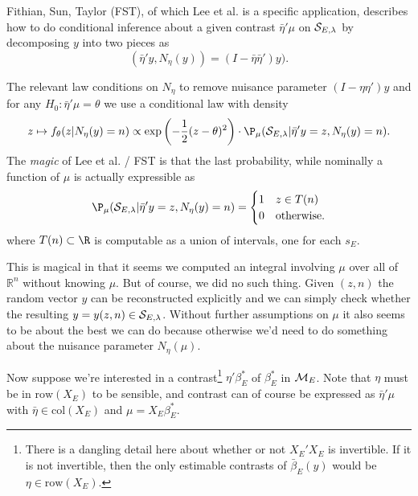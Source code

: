 \documentclass{article}
\newcommand{\OLS}{\bar{\beta}}
\begin{document}
        Fithian, Sun, Taylor (FST), of which Lee et al. is a specific
        application, describes how to do conditional inference about a
        given contrast $\bar{\eta}'\mu$ on ${\cal S}_{E,\lambda}$ by decomposing
        $y$ into two pieces as
        $$ (\bar{\eta}'y, N_{\eta}(y))=(I - \bar{\eta}\bar{\eta}')y).
        $$

        The relevant law conditions on $N_{\eta}$ to remove nuisance
        parameter $(I-\eta\eta')y$ and for any
        $H_0:\bar{\eta}'\mu=\theta$ we use a conditional law with
        density
        \begin{equation}
          \label{eq:selective:density}
        z \mapsto f_{\theta}(z | N_{\eta}(y)=n) \propto \exp
        \left(-\frac{1}{2}(z-\theta)^2 \right) \cdot \P_{\mu}({\cal
          S}_{E,\lambda} | \bar{\eta}'y=z, N_{\eta}(y)=n).
        \end{equation}
        The {\em magic} of Lee et al. / FST is that the last
        probability, while nominally a function of $\mu$ is actually
        expressible as
        \begin{equation}
          \label{eq:prob:selection}
        \P_{\mu}({\cal S}_{E,\lambda} | \bar{\eta}'y=z, N_{\eta}(y)=n) =
        \begin{cases}
          1 & z \in T(n) \\ 0 & \text{otherwise.}
          \end{cases}
        \end{equation}
        where $T(n) \subset \R$ is computable as a union of intervals,
        one for each $s_E$.

        This is magical in that it seems we computed an integral
        involving $\mu$ over all of $\mathbb{R}^n$ without knowing
        $\mu$. But of course, we did no such thing.  Given $(z,n)$ the
        random vector $y$ can be reconstructed explicitly and we can
        simply check whether the resulting $y=y(z,n) \in {\cal S}_{E,\lambda}$.
        Without further assumptions on $\mu$ it also seems to be about
        the best we can do because otherwise we'd need to do something
        about the nuisance parameter $N_{\eta}(\mu)$.

        Now suppose we're interested in a contrast\footnote{There is a dangling
        detail here about whether or not $X_E'X_E$ is invertible. If it is not invertible,
        then the only estimable contrasts of $\OLS_E(y)$ would be $\eta \in \text{row}(X_E)$.} $\eta'\beta_E^*$
        of
        $\beta_E^*$ in ${\cal M}_E$. Note that $\eta$ must be in
        $\text{row}(X_E)$ to be sensible, and contrast can of course
        be expressed as $\bar{\eta}'\mu$ with $\bar{\eta} \in \text{col}(X_E)$ and
        $\mu=X_E\beta_E^*$.
        
\end{document}
